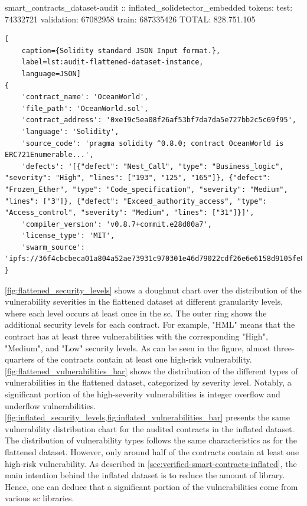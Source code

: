 smart\_contracts\_dataset-audit :: inflated\_solidetector\_embedded tokens:
	test: 74332721
	validation: 67082958
	train: 687335426
TOTAL: 828.751.105


\begin{lstlisting}[
    caption={Solidity standard JSON Input format.},
    label=lst:audit-flattened-dataset-instance,
    language=JSON]
{
    'contract_name': 'OceanWorld',
    'file_path': 'OceanWorld.sol',
    'contract_address': '0xe19c5ea08f26af53bf7da7da5e727bb2c5c69f95',
    'language': 'Solidity',
    'source_code': 'pragma solidity ^0.8.0; contract OceanWorld is ERC721Enumerable...',
    'defects': '[{"defect": "Nest_Call", "type": "Business_logic", "severity": "High", "lines": ["193", "125", "165"]}, {"defect": "Frozen_Ether", "type": "Code_specification", "severity": "Medium", "lines": ["3"]}, {"defect": "Exceed_authority_access", "type": "Access_control", "severity": "Medium", "lines": ["31"]}]',
    'compiler_version': 'v0.8.7+commit.e28d00a7',
    'license_type': 'MIT',
    'swarm_source': 'ipfs://36f4cbcbeca01a804a52ae73931c970301e46d79022cdf26e6e6158d9105fe83'
}
\end{lstlisting}

\cref{fig:flattened_security_levels} shows a doughnut chart over the distribution of the vulnerability severities in the flattened dataset at different granularity levels, where each level occurs at least once in the \acrshort{sc}. The outer ring shows the additional security levels for each contract. For example, "HML" means that the contract has at least three vulnerabilities with the corresponding "High", "Medium", and "Low" security levels. As can be seen in the figure, almost three-quarters of the contracts contain at least one high-risk vulnerability. \cref{fig:flattened_vulnerabilities_bar} shows the distribution of the different types of vulnerabilities in the flattened dataset, categorized by severity level. Notably, a significant portion of the high-severity vulnerabilities is integer overflow and underflow vulnerabilities. \cref{fig:inflated_security_levels,fig:inflated_vulnerabilities_bar} presents the same vulnerability distribution chart for the audited contracts in the inflated dataset. The distribution of vulnerability types follows the same characteristics as for the flattened dataset. However, only around half of the contracts contain at least one high-risk vulnerability. As described in \cref{sec:verified-smart-contracts-inflated}, the main intention behind the inflated dataset is to reduce the amount of library. Hence, one can deduce that a significant portion of the vulnerabilities come from various \acrshort{sc} libraries.

